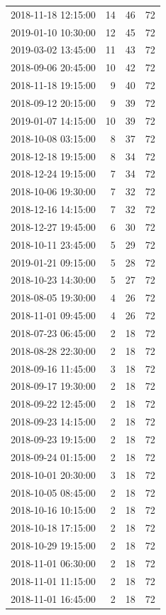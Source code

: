 \begin{tabular}{lrrr}
2018-11-18 12:15:00 & 14 & 46 & 72 \\
2019-01-10 10:30:00 & 12 & 45 & 72 \\
2019-03-02 13:45:00 & 11 & 43 & 72 \\
2018-09-06 20:45:00 & 10 & 42 & 72 \\
2018-11-18 19:15:00 & 9 & 40 & 72 \\
2018-09-12 20:15:00 & 9 & 39 & 72 \\
2019-01-07 14:15:00 & 10 & 39 & 72 \\
2018-10-08 03:15:00 & 8 & 37 & 72 \\
2018-12-18 19:15:00 & 8 & 34 & 72 \\
2018-12-24 19:15:00 & 7 & 34 & 72 \\
2018-10-06 19:30:00 & 7 & 32 & 72 \\
2018-12-16 14:15:00 & 7 & 32 & 72 \\
2018-12-27 19:45:00 & 6 & 30 & 72 \\
2018-10-11 23:45:00 & 5 & 29 & 72 \\
2019-01-21 09:15:00 & 5 & 28 & 72 \\
2018-10-23 14:30:00 & 5 & 27 & 72 \\
2018-08-05 19:30:00 & 4 & 26 & 72 \\
2018-11-01 09:45:00 & 4 & 26 & 72 \\
2018-07-23 06:45:00 & 2 & 18 & 72 \\
2018-08-28 22:30:00 & 2 & 18 & 72 \\
2018-09-16 11:45:00 & 3 & 18 & 72 \\
2018-09-17 19:30:00 & 2 & 18 & 72 \\
2018-09-22 12:45:00 & 2 & 18 & 72 \\
2018-09-23 14:15:00 & 2 & 18 & 72 \\
2018-09-23 19:15:00 & 2 & 18 & 72 \\
2018-09-24 01:15:00 & 2 & 18 & 72 \\
2018-10-01 20:30:00 & 3 & 18 & 72 \\
2018-10-05 08:45:00 & 2 & 18 & 72 \\
2018-10-16 10:15:00 & 2 & 18 & 72 \\
2018-10-18 17:15:00 & 2 & 18 & 72 \\
2018-10-29 19:15:00 & 2 & 18 & 72 \\
2018-11-01 06:30:00 & 2 & 18 & 72 \\
2018-11-01 11:15:00 & 2 & 18 & 72 \\
2018-11-01 16:45:00 & 2 & 18 & 72 \\

\end{tabular}
